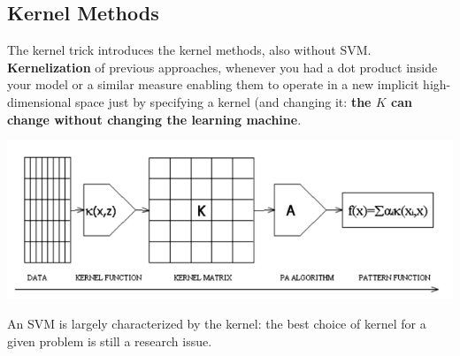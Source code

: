 \documentclass[10pt]{report}
\begin{document}
\subsection{Kernel Methods}
The kernel trick introduces the kernel methods, also without SVM. \textbf{Kernelization} of previous approaches, whenever you had a dot product inside your model or a similar measure enabling them to operate in a new implicit high-dimensional space just by specifying a kernel (and changing it: \textbf{the $K$ can change without changing the learning machine}.
\begin{center}
	\includegraphics[scale=0.75]{23.png}
\end{center}
An SVM is largely characterized by the kernel: the best choice of kernel for a given problem is still a research issue.
\end{document}
